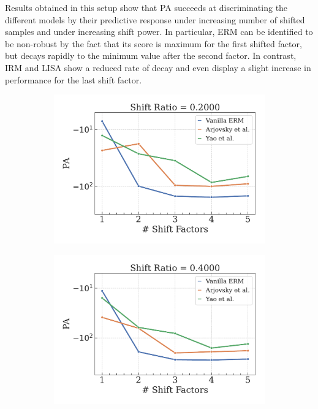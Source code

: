 Results obtained in this setup show that PA succeeds at discriminating the 
different models by their predictive response under increasing number of shifted samples and 
under increasing shift power. In particular, ERM can be identified to be non-robust by the fact 
that its score is maximum for the first shifted factor, but decays rapidly to the minimum value 
after the second factor. In contrast, IRM and LISA show a reduced rate of decay and even display a
slight increase in performance for the last shift factor. \\

\begin{figure}[H]
    \centering
    \begin{subfigure}[b]{0.3\textwidth}
        \centering
        \includegraphics[width=\textwidth]{img/results_discussion/datashift/shift_ratio=0.200.pdf}
    \end{subfigure}
    \hfill
    \begin{subfigure}[b]{0.3\textwidth}
        \centering
        \includegraphics[width=\textwidth]{img/results_discussion/datashift/shift_ratio=0.400.pdf}

\end{subfigure}
\end{figure}

